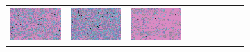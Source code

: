 \documentclass{ipol}
\begin{document}
\begin{figure}[ht]
\begin{subfigure}[t]{\linewidth}
\begin{tabular}{ccccccccc}
                \includegraphics[width=\s]{images/tower/DCB/bid_n10_64_grids.png}&
                \includegraphics[width=\s]{images/tower/DHT/bid_n10_64_grids.png}&
                \includegraphics[width=\s]{images/tower/LINEAR/bid_n10_64_grids.png}&

\end{tabular}
\end{subfigure}
\end{figure}
\end{document}
